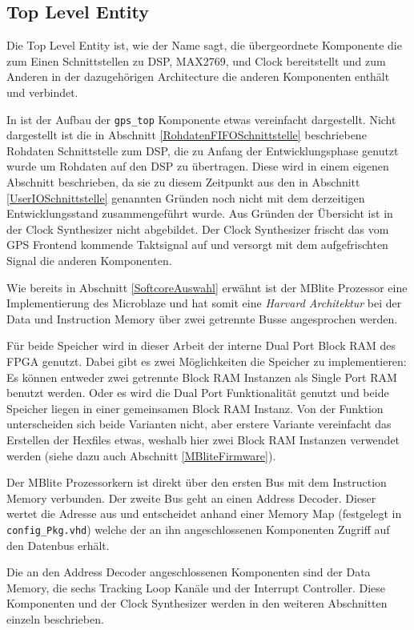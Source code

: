 \subsection{Top Level Entity}
Die Top Level Entity ist, wie der Name sagt, die übergeordnete Komponente die zum Einen Schnittstellen zu DSP, MAX2769, und Clock bereitstellt und zum Anderen in der dazugehörigen Architecture die anderen Komponenten enthält und verbindet.

In  ist der Aufbau der \lstinline$gps_top$ Komponente etwas vereinfacht dargestellt. Nicht dargestellt ist die in Abschnitt \ref{RohdatenFIFOSchnittstelle} beschriebene Rohdaten Schnittstelle zum DSP, die zu Anfang der Entwicklungsphase genutzt wurde um Rohdaten auf den DSP zu übertragen. Diese wird in einem eigenen Abschnitt beschrieben, da sie zu diesem Zeitpunkt aus den in Abschnitt \ref{UserIOSchnittstelle} genannten Gründen noch nicht mit dem derzeitigen Entwicklungsstand zusammengeführt wurde. Aus Gründen der Übersicht ist in  der Clock Synthesizer nicht abgebildet. Der Clock Synthesizer frischt das vom GPS Frontend kommende Taktsignal auf und versorgt mit dem aufgefrischten Signal die anderen Komponenten.


Wie bereits in Abschnitt \ref{SoftcoreAuswahl} erwähnt ist der  MBlite Prozessor eine Implementierung des Microblaze und hat somit eine \emph{Harvard Architektur} bei der Data und Instruction Memory über zwei getrennte Busse angesprochen werden.

Für beide Speicher wird in dieser Arbeit der interne Dual Port Block RAM des FPGA genutzt. Dabei gibt es zwei Möglichkeiten die Speicher zu implementieren: Es können entweder zwei getrennte Block RAM Instanzen als Single Port RAM benutzt werden. Oder es wird die Dual Port Funktionalität genutzt und beide Speicher liegen in  einer gemeinsamen Block RAM Instanz. Von der Funktion unterscheiden sich beide Varianten nicht, aber erstere Variante vereinfacht das Erstellen der Hexfiles etwas, weshalb hier zwei Block RAM Instanzen verwendet werden (siehe dazu auch Abschnitt \ref{MBliteFirmware}).

Der MBlite Prozessorkern ist direkt über den ersten Bus mit dem Instruction Memory verbunden. Der zweite Bus geht an einen Address Decoder. Dieser wertet die Adresse aus und entscheidet anhand einer Memory Map (festgelegt in \lstinline$config_Pkg.vhd$) welche der an ihn angeschlossenen Komponenten Zugriff auf den Datenbus erhält.

Die an den Address Decoder angeschlossenen Komponenten sind der Data Memory, die sechs Tracking Loop Kanäle und der Interrupt Controller. Diese Komponenten und der Clock Synthesizer werden in den weiteren Abschnitten einzeln beschrieben.